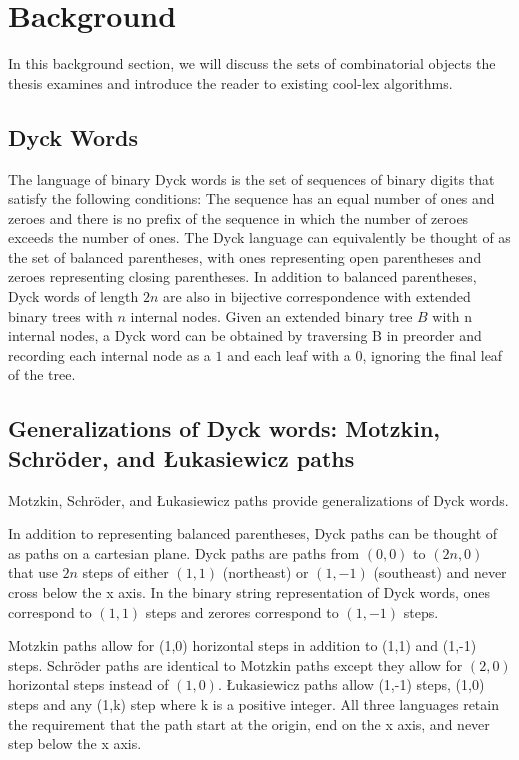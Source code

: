 \section{Background}
In this background section, we will discuss the sets of combinatorial objects the thesis examines and introduce the reader to existing cool-lex algorithms.


\subsection{Dyck Words}
The language of binary Dyck words is the set of sequences of binary digits that satisfy the following conditions: The sequence has an equal number of ones and zeroes and there is no prefix of the sequence in which the number of zeroes exceeds the number of ones.  The Dyck language can equivalently be thought of as the set of balanced parentheses, with ones representing open parentheses and zeroes representing closing parentheses.  
In addition to balanced parentheses, Dyck words of length $2n$ are also in bijective correspondence with extended binary trees with $n$ internal nodes. 
Given an extended binary tree $B$ with n internal nodes, a Dyck word can be obtained by traversing B in preorder and recording each internal node as a $1$ and each leaf with a $0$, ignoring the final leaf of the tree.

\subsection{Generalizations of Dyck words: Motzkin, Schröder, and Łukasiewicz paths}
Motzkin, Schröder, and Łukasiewicz paths provide generalizations of Dyck words.  

In addition to representing balanced parentheses, Dyck paths can be thought of as paths on a cartesian plane.  Dyck paths are paths from $(0,0)$ to $(2n,0)$ that use $2n$ steps of either $(1,1)$ (northeast) or $(1,-1)$ (southeast) and never cross below the x axis. In the binary string representation of Dyck words, ones correspond to $(1,1)$ steps and zerores correspond to $(1,-1)$ steps.

Motzkin paths allow for (1,0) horizontal steps in addition to (1,1) and (1,-1) steps. Schröder paths are identical to Motzkin paths except they allow for $(2,0)$ horizontal steps instead of $(1,0)$.  Łukasiewicz paths allow (1,-1) steps, (1,0) steps and any (1,k) step where k is a positive integer.  All three languages retain the requirement that the path start at the origin, end on the x axis, and never step below the x axis. 

